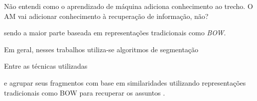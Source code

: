 Não entendi como o aprendizado de máquina adiciona conhecimento ao trecho. O AM vai adicionar conhecimento à recuperação de informação, não?


















sendo a maior parte baseada em representações tradicionais como \textit{BOW}.







Em geral, nesses trabalhos utiliza-se algoritmos de segmentação 

Entre as técnicas utilizadas 



e agrupar seus fragmentos com base em similaridades utilizando representações tradicionais como BOW para recuperar os assuntos . 





